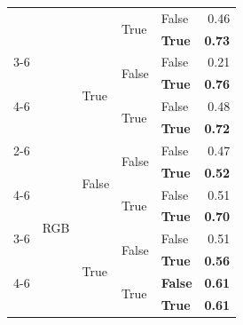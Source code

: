 \begin{tabular}{@{}lllllr@{}}
                                &                                   &                           & \multirow[c]{2}{*}{True}  & False                 & 0.46 \\
                                &                                   &                           &                           & \textbf{True}         & \textbf{0.73} \\
    \cmidrule{3-6}                                  
                                &                                   & \multirow[c]{4}{*}{True}  & \multirow[c]{2}{*}{False} & False                 & 0.21 \\
                                &                                   &                           &                           & \textbf{True}         & \textbf{0.76} \\
    \cmidrule{4-6}                                  
                                &                                   &                           & \multirow[c]{2}{*}{True}  & False                 & 0.48 \\
                                &                                   &                           &                           & \textbf{True}         & \textbf{0.72} \\
    \cmidrule{2-6}                                  
                                & \multirow[c]{9}{*}{RGB}           & \multirow[c]{4}{*}{False} & \multirow[c]{2}{*}{False} & False                 & 0.47 \\
                                &                                   &                           &                           & \textbf{True}         & \textbf{0.52} \\
    \cmidrule{4-6}                                  
                                &                                   &                           & \multirow[c]{2}{*}{True}  & False                 & 0.51 \\
                                &                                   &                           &                           & \textbf{True}         & \textbf{0.70} \\
    \cmidrule{3-6}                                  
                                &                                   & \multirow[c]{4}{*}{True}  & \multirow[c]{2}{*}{False} & False                 & 0.51 \\
                                &                                   &                           &                           & \textbf{True}         & \textbf{0.56} \\
    \cmidrule{4-6}                                  
                                &                                   &                           & \multirow[c]{2}{*}{True}  & \textbf{False}        & \textbf{0.61} \\
                                &                                   &                           &                           & \textbf{True}         & \textbf{0.61} \\
   \bottomrule
\end{tabular}
